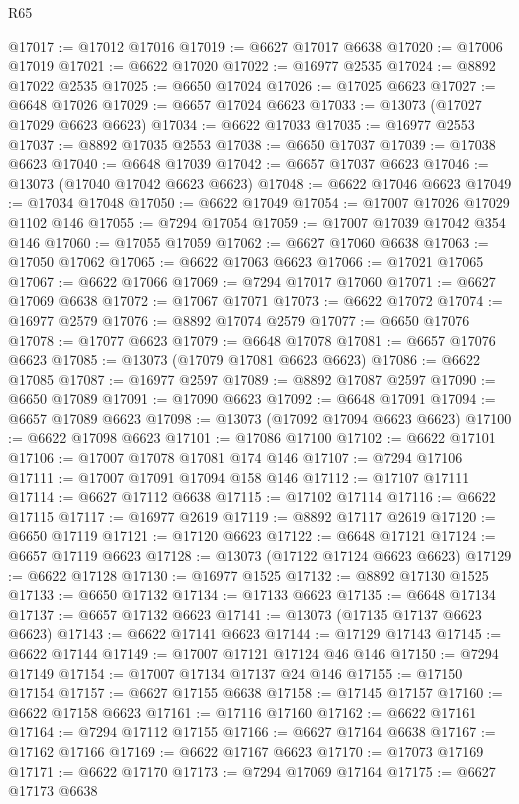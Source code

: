 \begin{lexlean}{R65}
\begin{coremodule}
{@17017 := @17012 @17016
@17019 := @6627 @17017 @6638
@17020 := @17006 @17019
@17021 := @6622 @17020
@17022 := @16977 @2535
@17024 := @8892 @17022 @2535
@17025 := @6650 @17024
@17026 := @17025 @6623
@17027 := @6648 @17026
@17029 := @6657 @17024 @6623
@17033 := @13073 (@17027 @17029 @6623 @6623)
@17034 := @6622 @17033
@17035 := @16977 @2553
@17037 := @8892 @17035 @2553
@17038 := @6650 @17037
@17039 := @17038 @6623
@17040 := @6648 @17039
@17042 := @6657 @17037 @6623
@17046 := @13073 (@17040 @17042 @6623 @6623)
@17048 := @6622 @17046 @6623
@17049 := @17034 @17048
@17050 := @6622 @17049
@17054 := @17007 @17026 @17029 @1102 @146
@17055 := @7294 @17054
@17059 := @17007 @17039 @17042 @354 @146
@17060 := @17055 @17059
@17062 := @6627 @17060 @6638
@17063 := @17050 @17062
@17065 := @6622 @17063 @6623
@17066 := @17021 @17065
@17067 := @6622 @17066
@17069 := @7294 @17017 @17060
@17071 := @6627 @17069 @6638
@17072 := @17067 @17071
@17073 := @6622 @17072
@17074 := @16977 @2579
@17076 := @8892 @17074 @2579
@17077 := @6650 @17076
@17078 := @17077 @6623
@17079 := @6648 @17078
@17081 := @6657 @17076 @6623
@17085 := @13073 (@17079 @17081 @6623 @6623)
@17086 := @6622 @17085
@17087 := @16977 @2597
@17089 := @8892 @17087 @2597
@17090 := @6650 @17089
@17091 := @17090 @6623
@17092 := @6648 @17091
@17094 := @6657 @17089 @6623
@17098 := @13073 (@17092 @17094 @6623 @6623)
@17100 := @6622 @17098 @6623
@17101 := @17086 @17100
@17102 := @6622 @17101
@17106 := @17007 @17078 @17081 @174 @146
@17107 := @7294 @17106
@17111 := @17007 @17091 @17094 @158 @146
@17112 := @17107 @17111
@17114 := @6627 @17112 @6638
@17115 := @17102 @17114
@17116 := @6622 @17115
@17117 := @16977 @2619
@17119 := @8892 @17117 @2619
@17120 := @6650 @17119
@17121 := @17120 @6623
@17122 := @6648 @17121
@17124 := @6657 @17119 @6623
@17128 := @13073 (@17122 @17124 @6623 @6623)
@17129 := @6622 @17128
@17130 := @16977 @1525
@17132 := @8892 @17130 @1525
@17133 := @6650 @17132
@17134 := @17133 @6623
@17135 := @6648 @17134
@17137 := @6657 @17132 @6623
@17141 := @13073 (@17135 @17137 @6623 @6623)
@17143 := @6622 @17141 @6623
@17144 := @17129 @17143
@17145 := @6622 @17144
@17149 := @17007 @17121 @17124 @46 @146
@17150 := @7294 @17149
@17154 := @17007 @17134 @17137 @24 @146
@17155 := @17150 @17154
@17157 := @6627 @17155 @6638
@17158 := @17145 @17157
@17160 := @6622 @17158 @6623
@17161 := @17116 @17160
@17162 := @6622 @17161
@17164 := @7294 @17112 @17155
@17166 := @6627 @17164 @6638
@17167 := @17162 @17166
@17169 := @6622 @17167 @6623
@17170 := @17073 @17169
@17171 := @6622 @17170
@17173 := @7294 @17069 @17164
@17175 := @6627 @17173 @6638
}
\end{coremodule}
\end{lexlean}
